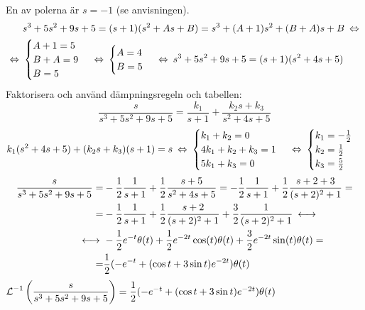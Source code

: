 \begin{task}{4.7}
	En av polerna är $s=-1$ (se anvisningen).
	\begin{align*}
	&s^3+5s^2+9s+5=(s+1)(s^2+As+B)=s^3+(A+1)s^2+(B+A)s+B \lra \\ \lra
	&\begin{cases}
	A+1=5 \\
	B+A=9 \\
	B=5
	\end{cases} \lra
	\begin{cases}
	A=4 \\
	B=5
	\end{cases} \lra
	s^3+5s^2+9s+5=(s+1)(s^2+4s+5)
	\end{align*}
	Faktorisera och använd dämpningsregeln och tabellen:
	\[\frac{s}{s^3+5s^2+9s+5}=\frac{k_1}{s+1}+\frac{k_2s+k_3}{s^2+4s+5}\]
	\[k_1(s^2+4s+5)+(k_2s+k_3)(s+1)=s \lra
	\begin{cases}
	k_1+k_2=0 \\
	4k_1+k_2+k_3=1 \\
	5k_1+k_3=0
	\end{cases} \lra
	\begin{cases}
	k_1=-\frac{1}{2} \\
	k_2=\frac{1}{2} \\
	k_3=\frac{5}{2}
	\end{cases} \]
	\begin{align*}
	\frac{s}{s^3+5s^2+9s+5}=
	&-\frac{1}{2}\*\frac{1}{s+1}+\frac{1}{2}\*\frac{s+5}{s^2+4s+5}=
	-\frac{1}{2}\*\frac{1}{s+1}+\frac{1}{2}\*\frac{s+2+3}{(s+2)^2+1}= \\ =
	&-\frac{1}{2}\*\frac{1}{s+1}+\frac{1}{2}\*\frac{s+2}{(s+2)^2+1}+\frac{3}{2}\*\frac{1}{(s+2)^2+1} \llra \\ \llra
	&-\frac{1}{2}e^{-t}\theta(t)+\frac{1}{2}e^{-2t}\cos(t)\theta(t)+\frac{3}{2}e^{-2t}\sin(t)\theta(t)= \\ =
	&\frac{1}{2}(-e^{-t}+(\cos t+3\sin t)e^{-2t})\theta(t)
	\end{align*}
	\ans $\operatorname{\mathcal{L}}^{-1}\left(\dfrac{s}{s^3+5s^2+9s+5}\right)=\dfrac{1}{2}(-e^{-t}+(\cos t+3\sin t)e^{-2t})\theta(t)$
\end{task}

